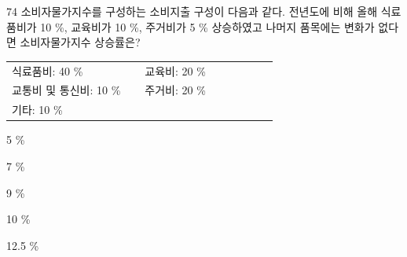 \begin{question}{74}
소비자물가지수를 구성하는 소비지출 구성이 다음과 같다. 전년도에 비해 올해 식료품비가 10 \%, 교육비가 10 \%, 주거비가 5 \% 상승하였고 나머지 품목에는 변화가 없다면 소비자물가지수 상승률은?
\begin{framedtext}
\begin{tabular}{@{}p{0.45\linewidth}p{0.45\linewidth}@{}}
식료품비: 40 \% & 교육비: 20 \% \\
교통비 및 통신비: 10 \% & 주거비: 20 \% \\
기타: 10 \% &
\end{tabular}
\end{framedtext}
\begin{choices}
  \item 5 \%
  \item 7 \%
  \item 9 \%
  \item 10 \%
  \item 12.5 \%
\end{choices}
\end{question}
